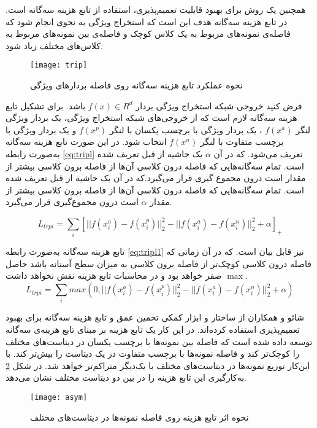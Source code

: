 همچنین یک روش برای بهبود قابلیت تعمیم‌پذیری، استفاده از تابع هزینه سه‌گانه
\cite{schroff2015facenet}
است. در تابع هزینه سه‌گانه هدف این است که استخراج ویژگی به نحوی انجام شود که فاصله‌ی نمونه‌های مربوط به یک کلاس کوچک و فاصله‌ی بین نمونه‌های مربوط به کلاس‌های مختلف زیاد شود.
\begin{figure}[h]
	\centerline{\texttt{[image: trip]}}
	\caption{نحوه عملکرد تابع هزینه سه‌گانه روی فاصله بردارهای ویژگی \cite{schroff2015facenet} }
	\label{fig:trip}
\end{figure}

فرض کنید خروجی شبکه استخراج ویژگی بردار
$f(x) \in R^d$ 
 باشد. برای تشکیل تابع هزینه سه‌گانه لازم است که از خروجی‌های شبکه استخراج ویژگی، یک بردار ویژگی لنگر
$f(x^a)$ 
 ، یک بردار ویژگی با برچسب یکسان با لنگر
$f(x^p)$  
   و یک بردار ویژگی با برچسب متفاوت با لنگر 
$f(x^n)$ 
    انتخاب شود. در این صورت تابع هزینه سه‌گانه به‌صورت رابطه
\ref{eq:tripl}
 تعریف می‌شود. که در آن 
$\alpha$ 
  یک حاشیه از قبل تعریف شده است. تمام سه‌گانه‌هایی که فاصله درون کلاسی آن‌ها از فاصله برون کلاسی بیشتر از مقدار  است درون مجموع گیری قرار می‌گیرد.که در آن  یک حاشیه از قبل تعریف شده است. تمام سه‌گانه‌هایی که فاصله درون کلاسی آن‌ها از فاصله برون کلاسی بیشتر از مقدار 
$\alpha$
   است درون مجموع‌گیری قرار می‌گیرد.
 
 \begin{equation}\label{eq:tripl}
L_{trpi} = \sum_{i}{[||f(x_i^a)-f(x_i^p)||_2^2-||f(x_i^a)-f(x_i^n)||_2^2+\alpha]_+}
 \end{equation}

تابع هزینه سه‌گانه به‌صورت رابطه
\ref{eq:tripl1}
نیز قابل بیان است. که در آن زمانی که فاصله درون کلاسی کوچک‌تر از فاصله برون کلاسی به میزان سطح آستانه  باشد حاصل $\max$ صفر خواهد بود و در محاسبات تابع هزینه نقش نخواهد داشت.
 \begin{equation}\label{eq:tripl1}
	L_{trpi} = \sum_{i}{max(0,||f(x_i^a)-f(x_i^p)||_2^2-||f(x_i^a)-f(x_i^n)||_2^2+\alpha)}
\end{equation}

شائو و همکاران
\cite{shao2019multi}
از ساختار  و ابزار کمکی تخمین عمق و تابع هزینه سه‌گانه برای بهبود تعمیم‌پذیری استفاده کرده‌اند. در این کار یک تابع هزینه بر مبنای تابع هزینه‌ی سه‌گانه توسعه داده شده است که فاصله بین نمونه‌ها با برچسب یکسان در دیتاست‌های مختلف را کوچک‌تر کند و فاصله نمونه‌ها با برچسب متفاوت در یک دیتاست را بیش‌تر کند. با این‌کار توزیع نمونه‌ها در دیتاست‌های مختلف با یک‌دیگر متراکم‌تر خواهد شد. در شکل
\ref{fig:asym} 
به‌کارگیری این تابع هزینه را در بین دو دیتاست مختلف نشان می‌دهد.
\begin{figure}[h]
	\centerline{\texttt{[image: asym]}}
	\caption{نحوه اثر تابع هزینه روی فاصله نمونه‌ها در دیتاست‌های مختلف \cite{shao2019multi} }
	\label{fig:asym}
\end{figure}

